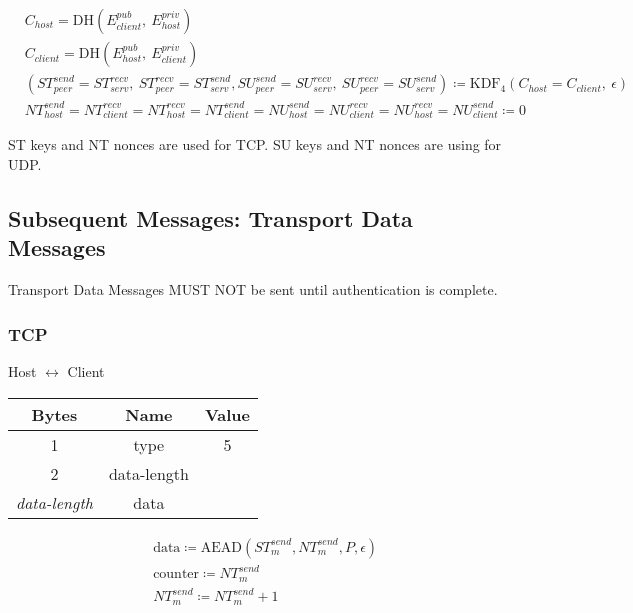 \begin{align*}
    & C_{host} = \text{DH}(E_{client}^{pub},\ E_{host}^{priv})\\
    & C_{client} = \text{DH}(E_{host}^{pub},\ E_{client}^{priv})\\
    & (\mathit{ST}_{peer}^{send} = \mathit{ST}_{serv}^{recv},\ \mathit{ST}_{peer}^{recv} = \mathit{ST}_{serv}^{send}, \mathit{SU}_{peer}^{send} = \mathit{SU}_{serv}^{recv},\ \mathit{SU}_{peer}^{recv} = \mathit{SU}_{serv}^{send}) \coloneqq \text{KDF}_4(C_{host} = C_{client},
    \ \epsilon) \\
    & \mathit{NT}_{host}^{send} = \mathit{NT}_{client}^{recv} = \mathit{NT}_{host}^{recv} = \mathit{NT}_{client}^{send} = \mathit{NU}_{host}^{send} = \mathit{NU}_{client}^{recv} = \mathit{NU}_{host}^{recv} = \mathit{NU}_{client}^{send} \coloneqq 0
\end{align*}

ST keys and NT nonces are used for TCP. SU keys and NT nonces are using for UDP.

\subsection{Subsequent Messages: Transport Data Messages}

Transport Data Messages MUST NOT be sent until authentication is complete.

\subsubsection{TCP}

\begin{center}
    Host $\leftrightarrow$ Client\\
    \begin{tabular}{|c|c|c|}
        \hline
        \textbf{Bytes}     & \textbf{Name} & \textbf{Value} \\
        \hline
        1                  & type          & 5              \\
        \hline
        2                  & data-length   &                \\
        \hline
        \emph{data-length} & data          &                \\
        \hline
    \end{tabular}
\end{center}

\begin{align*}
    & \text{data} \coloneqq \text{AEAD}(\mathit{ST}_{m}^{send},\mathit{NT}_{m}^{send}, P, \epsilon)\\
    & \text{counter} \coloneqq \mathit{NT}_{m}^{send}\\
    & \mathit{NT}_{m}^{send} \coloneqq \mathit{NT}_{m}^{send} + 1
\end{align*}


